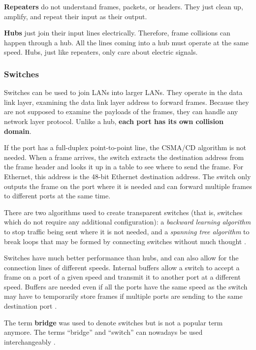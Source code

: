 \textbf{Repeaters} do not understand frames, packets, or headers.
They just clean up, amplify, and repeat their input as their output.

\textbf{Hubs} just join their input lines electrically.
Therefore, frame collisions can happen through a hub.
All the lines coming into a hub must operate at the same speed.
Hubs, just like repeaters, only care about electric signals.

\subsubsection{Switches}

Switches can be used to join LANs into larger LANs.
They operate in the data link layer, examining the data link layer address to forward frames.
Because they are not supposed to examine the payloads of the frames, they can handle any network layer protocol.
Unlike a hub, \textbf{each port has its own collision domain}.

If the port has a full-duplex point-to-point line, the CSMA/CD algorithm is not needed.
When a frame arrives, the switch extracts the destination address from the frame header and looks it up in a table to see where to send the frame.
For Ethernet, this address is the 48-bit Ethernet destination address.
The switch only outputs the frame on the port where it is needed and can forward multiple frames to different ports at the same time.

There are two algorithms used to create transparent switches (that is, switches which do not require any additional configuration): a \textit{backward learning algorithm} to stop traffic being sent where it is not needed, and a \textit{spanning tree algorithm} to break loops that may be formed by connecting switches without much thought \cite[p.~333]{computer-networks-tanenbaum-2012}.

Switches have much better performance than hubs, and can also allow for the connection lines of different speeds. Internal buffers allow a switch to accept a frame on a port of a given speed and transmit it to another port at a different speed. Buffers are needed even if all the ports have the same speed as the switch may have to temporarily store frames if multiple ports are sending to the same destination port \cite[p.~341]{computer-networks-tanenbaum-2012}.

The term \textbf{bridge} was used to denote switches but is not a popular term anymore. The terms ``bridge'' and ``switch'' can nowadays be used interchangeably \cite[p.~350]{computer-networks-tanenbaum-2012}.

